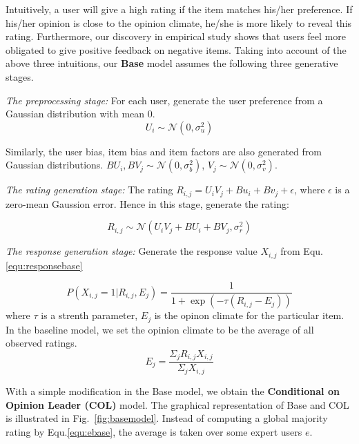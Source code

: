 \documentclass{sig-alternate}
\begin{document}
Intuitively, a user will give a high rating if the item matches his/her preference. If his/her opinion is close to the opinion climate, he/she is more likely to reveal this rating. Furthermore, our  discovery in  empirical study shows that users feel more obligated to give positive feedback on negative items. Taking into account of the above three intuitions, our \textbf{Base} model assumes the following three generative stages.

\textit{The preprocessing stage:} For each user, generate the user preference from a Gaussian distribution with mean $0$.
\begin{equation}\label{equ:preferencebase}
U_i \sim \mathcal{N}(0,\sigma_u^2)
\end{equation}

Similarly, the user bias, item bias and item factors are also generated from Gaussian distributions. $BU_i, BV_j \sim \mathcal{N}(0,\sigma_b^2)$,  $V_j \sim \mathcal{N}(0,\sigma_v^2)$.

\textit{The rating generation stage:} The rating $R_{i,j}=U_iV_j+Bu_i + Bv_j +\epsilon$, where $\epsilon$ is a zero-mean Gaussion error. Hence in this stage, generate the rating: 

\begin{equation}\label{equ:rating}
R_{i,j} \sim \mathcal{N}(U_iV_j+BU_i+BV_j, \sigma_r^2)
\end{equation}

\textit{The response generation stage:} Generate the response value $X_{i,j}$ from Equ.\ref{equ:responsebase}

\begin{equation}\label{equ:responsebase}
 P(X_{i,j}=1|R_{i,j},E_j)=\frac{1}{1+\exp{(-\tau(R_{i,j}-E_j))}}
\end{equation}
 where $\tau$ is a strenth parameter, $E_j$ is the opinon climate for the particular item. In the baseline model, we set the opinion climate to be the average of all observed ratings.
\begin{equation}\label{equ:ebase}
 E_j=\frac{\Sigma_jR_{i,j}X_{i,j}}{\Sigma_j X_{i,j}}
\end{equation}


With a simple modification in the Base model, we obtain the \textbf{Conditional on Opinion Leader (COL)} model. The graphical representation of Base and COL is illustrated in Fig.~\ref{fig:basemodel}. Instead of computing a global majority rating by Equ.\ref{equ:ebase}, the average is taken over some expert users $e$.
\end{document}

